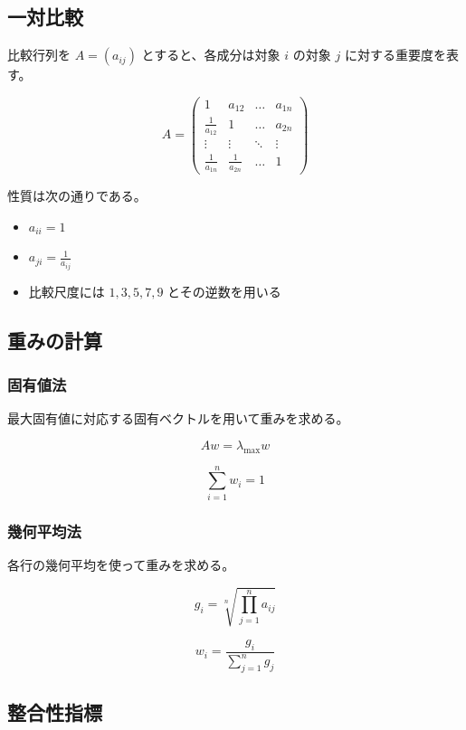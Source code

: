 \documentclass[12pt]{ltjsarticle}
\begin{document}
\subsection{一対比較}

比較行列を \(A = \left( a_{ij} \right)\) とすると、各成分は対象 \(i\)
の対象 \(j\) に対する重要度を表す。

\[
A = \begin{pmatrix}
1 & a_{12} & \ldots & a_{1n} \\
\frac{1}{a_{12}} & 1 & \ldots & a_{2n} \\
\vdots & \vdots & \ddots & \vdots \\
\frac{1}{a_{1n}} & \frac{1}{a_{2n}} & \ldots & 1
\end{pmatrix}
\]

性質は次の通りである。

\begin{itemize}
\item \(a_{ii} = 1\)
\item \(a_{ji} = \frac{1}{a_{ij}}\)
\item 比較尺度には \(1,3,5,7,9\) とその逆数を用いる
\end{itemize}

\subsection{重みの計算}

\subsubsection{固有値法}

最大固有値に対応する固有ベクトルを用いて重みを求める。

\[
Aw = \lambda_{\text{max}} w
\]

\[
\sum_{i=1}^{n} w_i = 1
\]

\subsubsection{幾何平均法}

各行の幾何平均を使って重みを求める。

\[
g_i = \sqrt[n]{\prod_{j=1}^{n} a_{ij}}
\]

\[
w_i = \frac{g_i}{\sum_{j=1}^{n} g_j}
\]

\subsection{整合性指標}
\end{document}
